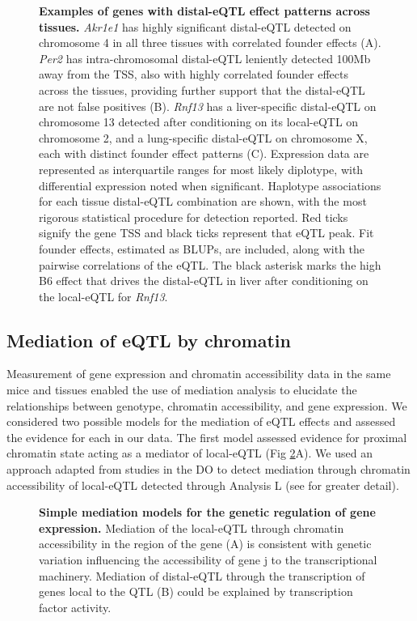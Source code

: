 \documentclass[10pt,letterpaper]{article}
\begin{document}
\begin{figure}[h!]
\caption{\textbf{Examples of genes with distal-eQTL effect patterns across tissues.} \textit{Akr1e1} has highly significant distal-eQTL detected on chromosome 4 in all three tissues with correlated founder effects (A). \textit{Per2} has intra-chromosomal distal-eQTL leniently detected 100Mb away from the TSS, also with highly correlated founder effects across the tissues, providing further support that the distal-eQTL are not false positives (B). \textit{Rnf13} has a liver-specific distal-eQTL on chromosome 13 detected after conditioning on its local-eQTL on chromosome 2, and a lung-specific distal-eQTL on chromosome X, each with distinct founder effect patterns (C). Expression data are represented as interquartile ranges for most likely diplotype, with differential expression noted when significant. Haplotype associations for each tissue distal-eQTL combination are shown, with the most rigorous statistical procedure for detection reported. Red ticks signify the gene TSS and black ticks represent that eQTL peak. Fit founder effects, estimated as BLUPs, are included, along with the pairwise correlations of the eQTL. The black asterisk marks the high B6 effect that drives the distal-eQTL in liver after conditioning on the local-eQTL for \textit{Rnf13}.
\label{fig:correlated_distal_eqtl}}
\end{figure}

\subsection*{Mediation of eQTL by chromatin}

Measurement of gene expression and chromatin accessibility data in the same mice and tissues enabled the use of mediation analysis to elucidate the relationships between genotype, chromatin accessibility, and gene expression. 
We considered two possible models for the mediation of eQTL effects and assessed the evidence for each in our data.
The first model assessed evidence for proximal chromatin state acting as a mediator of local-eQTL (Fig \ref{fig:graph}A). We used an approach adapted from studies in the DO \cite{Chick2016} to detect mediation through chromatin accessibility of local-eQTL detected through Analysis L (see  for greater detail).  

\begin{figure}[h!]
\caption{{\bf Simple mediation models for the genetic regulation of gene expression.} 
Mediation of the local-eQTL through chromatin accessibility in the region of the gene (A) is consistent with genetic variation influencing the accessibility of gene j to the transcriptional machinery. Mediation of distal-eQTL through the transcription of genes local to the QTL (B) could be explained by transcription factor activity.
\label{fig:graph}}
\end{figure}
\end{document}
